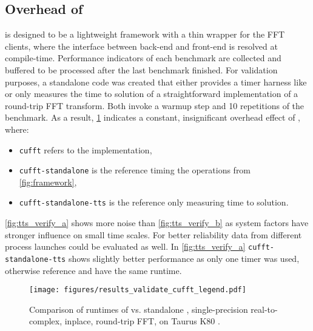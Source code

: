 
\subsection{Overhead of \gearshifft{}}
\gearshifft{} is designed to be a lightweight framework with a thin wrapper for the FFT clients, where the interface between back-end and front-end is resolved at compile-time. Performance indicators of each benchmark are collected and buffered to be processed after the last benchmark finished. For validation purposes, a \cufft{} standalone code \cite{gearshifft_github} was created that either provides a timer harness like \gearshifft{} or only measures the time to solution of a straightforward implementation of a round-trip FFT transform. Both invoke a warmup step and 10 repetitions of the benchmark. 
As a result, \cref{fig:verify_cufft} indicates a constant, insignificant overhead effect of \gearshifft{}, where:%
\begin{itemize}
\item \texttt{cufft} refers to the \gearshifft{} implementation,
\item \texttt{cufft-standalone} is the reference timing the operations from \cref{fig:framework},
\item \texttt{cufft-standalone-tts} is the reference only measuring time to solution.
\end{itemize}
\cref{fig:tts_verify_a} shows more noise than \cref{fig:tts_verify_b} as system factors have stronger influence on small time scales. For better reliability data from different process launches could be evaluated as well. In \cref{fig:tts_verify_a} \texttt{cufft-standalone-tts} shows slightly better performance as only one timer was used, otherwise reference and \gearshifft{} have the same runtime.




\begin{figure}[!htbp]
\vspace{-1em}
  \centering
  \texttt{[image: figures/results\_validate\_cufft\_legend.pdf]}\vspace{-1em}
  \hfill
  \caption{Comparison of runtimes of \gearshifft{} vs. standalone \cufft{}, single-precision real-to-complex, inplace, round-trip FFT, on Taurus K80 \cite{taurus}.}
  \label{fig:verify_cufft}
\end{figure}

